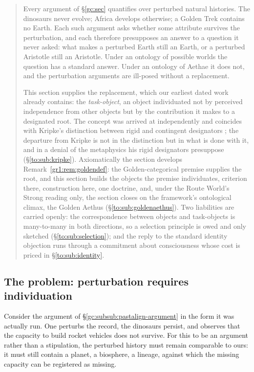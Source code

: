 \documentclass[11pt]{article}
\numberwithin{equation}{section}
\theoremstyle{plain}
\theoremstyle{definition}
\theoremstyle{remark}
\begin{document}
\begin{quote}\small
Every argument of \S\ref{gc:sec} quantifies over perturbed natural
histories. The dinosaurs never evolve; Africa develops otherwise; a
Golden Trek contains no Earth. Each such argument asks whether some
attribute survives the perturbation, and each therefore presupposes an
answer to a question it never asked: what makes a perturbed Earth still
an Earth, or a perturbed Aristotle still an Aristotle. Under an ontology
of possible worlds the question has a standard answer. Under an ontology
of Aethae it does not, and the perturbation arguments are ill-posed
without a replacement.

This section supplies the replacement, which our earliest dated
work already contains: the \emph{task-object}, an object individuated
not by perceived independence from other objects but by the contribution
it makes to a designated root. The concept was arrived at
independently and coincides with Kripke's distinction between rigid and
contingent designators \cite{kripke1980naming}; the departure from Kripke is
not in the distinction but in what is done with it, and in a denial of
the metaphysics his rigid designators presuppose
(\S\ref{to:sub:kripke}). Axiomatically the section develops
Remark~\ref{gr1:rem:goldendef}: the Golden-categorical premise
supplies the root, and this section builds the objects the premise
individuates, criterion there, construction here, one doctrine, and, under the Route World's Strong reading only, the section closes
on the framework's ontological climax, the Golden Aethus
(\S\ref{to:sub:goldenaethus}).
Two liabilities are carried openly: the
correspondence between objects and task-objects is many-to-many in both
directions, so a selection principle is owed and only sketched
(\S\ref{to:sub:selection}); and the reply to the standard identity
objection runs through a commitment about consciousness whose cost is
priced in \S\ref{to:sub:identity}.
\end{quote}

\subsection{The problem: perturbation requires individuation}
\label{to:sub:problem}

Consider the argument of \S\ref{gc:subsub:pastalign-argument} in the
form it was actually run. One perturbs the record, the dinosaurs
persist, and observes that the capacity to build rocket vehicles does
not survive. For this to be an argument rather than a stipulation, the
perturbed history must remain comparable to ours: it must still contain
a planet, a biosphere, a lineage, against which the missing capacity can
be registered as missing.
\end{document}
